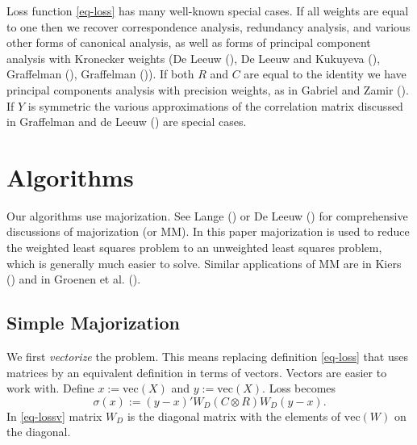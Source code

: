 \documentclass[
  12pt,
  letterpaper,
  DIV=11,
  numbers=noendperiod]{scrartcl}
\newcommand{\sectionbreak}{\clearpage}
\begin{document}
Loss function \eqref{eq-loss} has many well-known special cases. If all
weights are equal to one then we recover correspondence analysis,
redundancy analysis, and various other forms of canonical analysis, as
well as forms of principal component analysis with Kronecker weights (De
Leeuw (), De Leeuw and Kukuyeva
(), Graffelman
(), Graffelman
()). If both \(R\) and \(C\) are
equal to the identity we have principal components analysis with
precision weights, as in Gabriel and Zamir
(). If \(Y\) is symmetric the
various approximations of the correlation matrix discussed in
{Graffelman and de Leeuw} ()
are special cases.

\sectionbreak

\section{Algorithms}\label{algorithms}

Our algorithms use majorization. See Lange
() or De Leeuw
() for comprehensive discussions of
majorization (or MM). In this paper majorization is used to reduce the
weighted least squares problem to an unweighted least squares problem,
which is generally much easier to solve. Similar applications of MM are
in Kiers () and in Groenen et al.
().

\subsection{Simple Majorization}\label{simple-majorization}

We first \emph{vectorize} the problem. This means replacing definition
\eqref{eq-loss} that uses matrices by an equivalent definition in terms
of vectors. Vectors are easier to work with. Define \(x:=\text{vec}(X)\)
and \(y:=\text{vec}(X)\). Loss becomes \begin{equation}
\sigma(x):=(y-x)'W_D(C\otimes R)W_D(y-x).\label{eq-lossv}
\end{equation} In \eqref{eq-lossv} matrix \(W_D\) is the diagonal matrix
with the elements of \(\text{vec}(W)\) on the diagonal.
\end{document}
